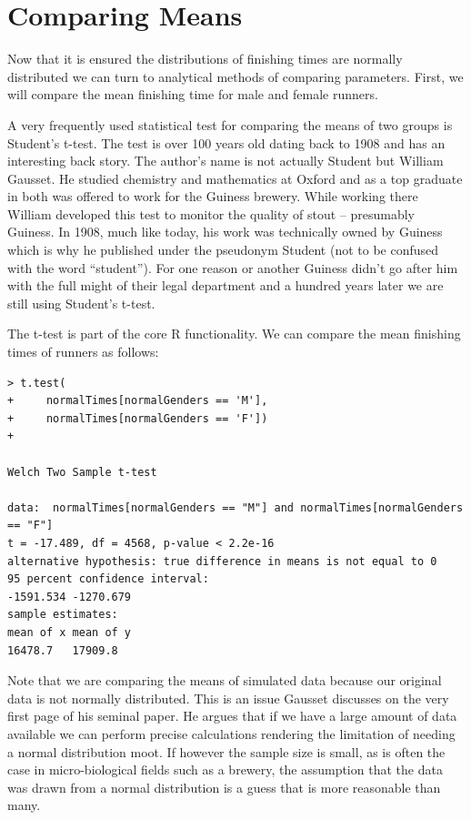 \documentclass{tufte-book} %
\begin{document}
\section{Comparing Means}
Now that it is ensured the distributions of finishing times are normally distributed we can turn to analytical methods of comparing parameters. First, we will compare the mean finishing time for male and female runners. 

A very frequently used statistical test for comparing the means of two groups is Student's \hbox{t-test}\cite{student1908}. The test is over 100 years old dating back to 1908 and has an interesting back story. The author's name is not actually Student but William Gausset. He studied chemistry and mathematics at Oxford and as a top graduate in both was offered to work for the Guiness brewery. While working there William developed this test to monitor the quality of stout -- presumably Guiness. In 1908, much like today, his work was technically owned by Guiness which is why he published under the pseudonym Student (not to be confused with the word ``student''). For one reason or another Guiness didn't go after him with the full might of their legal department and a hundred years later we are still using Student's \hbox{t-test}.

The \hbox{t-test} is part of the core R functionality. We can compare the mean finishing times of runners as follows:

\begin{Verbatim}
> t.test(
+     normalTimes[normalGenders == 'M'], 
+     normalTimes[normalGenders == 'F'])
+ 

Welch Two Sample t-test

data:  normalTimes[normalGenders == "M"] and normalTimes[normalGenders == "F"]
t = -17.489, df = 4568, p-value < 2.2e-16
alternative hypothesis: true difference in means is not equal to 0
95 percent confidence interval:
-1591.534 -1270.679
sample estimates:
mean of x mean of y 
16478.7   17909.8 
\end{Verbatim}

Note that we are comparing the means of simulated data because our original data is not normally distributed. This is an issue Gausset discusses on the very first page of his seminal paper. He argues that if we have a large amount of data available we can perform precise calculations rendering the limitation of needing a normal distribution moot. If however the sample size is small, as is often the case in micro-biological fields such as a brewery, the assumption that the data was drawn from a normal distribution is a guess that is more reasonable than many. 
\end{document}
